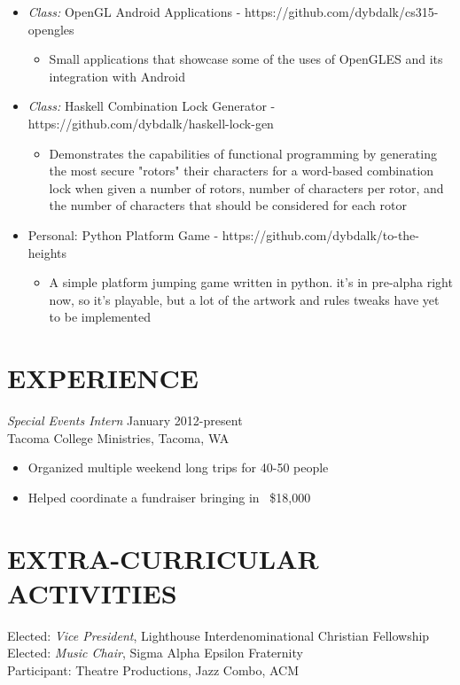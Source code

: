 \documentclass[margin]{res}
\begin{document}
\begin{resume}
\begin{itemize}
\begin{itemize}
	\end{itemize}
	\item {\sl Class:} OpenGL Android Applications - https://github.com/dybdalk/cs315-opengles
	\begin{itemize}
	\item Small applications that showcase some of the uses of OpenGLES and its integration with Android
	\end{itemize}
	\item {\sl Class:} Haskell Combination Lock Generator - https://github.com/dybdalk/haskell-lock-gen
	\begin{itemize}
	\item Demonstrates the capabilities of functional programming by generating the most secure "rotors" their characters for a word-based combination lock when given a number of rotors, number of characters per rotor, and the number of characters that should be considered for each rotor
	\end{itemize}
	\item {Personal:} Python Platform Game - https://github.com/dybdalk/to-the-heights
	\begin{itemize}
	\item A simple platform jumping game written in python. it's in pre-alpha right now, so it's playable, but a lot of the artwork and rules tweaks have yet to be implemented
	\end{itemize}
	
\end{itemize}						
 
\section{EXPERIENCE} {\sl Special Events Intern} \hfill January 2012-present \\ 
                Tacoma College Ministries, Tacoma, WA 
                 \begin{itemize}  \itemsep -2pt %
                 \item   Organized multiple weekend long trips for 40-50 people 
                \item   Helped coordinate a fundraiser bringing in ~\$18,000 
                \end{itemize}

\section{EXTRA-CURRICULAR \\ ACTIVITIES}             
            Elected: {\it Vice President}, Lighthouse Interdenominational Christian Fellowship \\
            Elected: {\it Music Chair}, Sigma Alpha Epsilon Fraternity \\
           	Participant: Theatre Productions, Jazz Combo, ACM
 

\end{resume}
\end{document}
